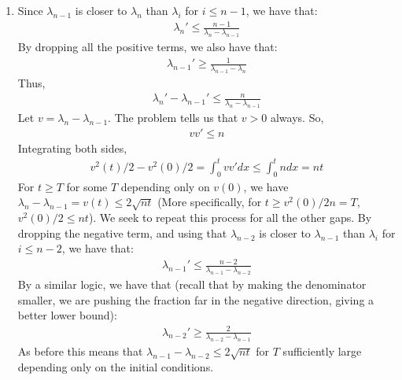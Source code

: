 \documentclass[12pt]{article}
\theoremstyle{definitionstyle}
\newcommand{\1}{\mathds 1}
\begin{document}
\begin{enumerate}
        \item Since $\lambda_{n-1}$ is closer to $\lambda_n$ than $\lambda_i$ for $i \leq n-1$, we have that:
        \begin{align*}
            \lambda_n' \leq \frac{n-1}{\lambda_n - \lambda_{n-1}}
        \end{align*}
        By dropping all the positive terms, we also have that:
        \begin{align*}
            \lambda_{n-1}' \geq \frac{1}{\lambda_{n-1} - \lambda_n}
        \end{align*}
        Thus,
        \begin{align*}
            \lambda_n' - \lambda_{n-1}' \leq \frac{n}{\lambda_n - \lambda_{n-1}}
        \end{align*}
        Let $v = \lambda_n - \lambda_{n-1}$. The problem tells us that $v > 0$ always. So,
        \begin{align*}
            vv' \leq n
        \end{align*}
        Integrating both sides,
        \begin{align*}
            v^2(t)/2 - v^2(0)/2 = \int_{0}^t vv' dx \leq \int_0^t n dx = nt
        \end{align*}
        For $t \geq T$ for some $T$ depending only on $v(0)$, we have $\lambda_n - \lambda_{n-1} = v(t) \leq 2\sqrt{nt}$ (More specifically, for $t \geq v^2(0)/2n = T$, $v^2(0)/2 \leq nt$). We seek to repeat this process for all the other gaps. By dropping the negative term, and using that $\lambda_{n-2}$ is closer to $\lambda_{n-1}$ than $\lambda_i$ for $i \leq n-2$, we have that:
        \begin{align*}
            \lambda_{n-1}' \leq \frac{n-2}{\lambda_{n-1} - \lambda_{n-2}}
        \end{align*}
        By a similar logic, we have that (recall that by making the denominator smaller, we are pushing the fraction far in the negative direction, giving a better lower bound):
        \begin{align*}
            \lambda_{n-2}' \geq \frac{2}{\lambda_{n-2}-\lambda_{n-1}}
        \end{align*}
        As before this means that $\lambda_{n-1} - \lambda_{n-2} \leq 2\sqrt{nt}$ for $T$ sufficiently large depending only on the initial conditions.


\end{enumerate}
\end{document}
